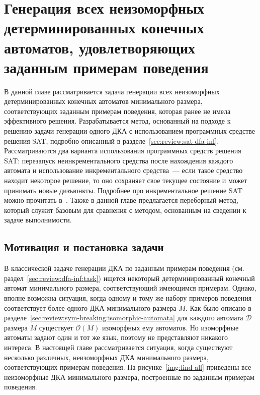 
\chapter{Генерация всех неизоморфных детерминированных конечных автоматов, удовлетворяющих заданным примерам поведения} 
\label{sec:findall}

В данной главе рассматривается задача генерации всех неизоморфных детерминированных конечных автоматов минимального размера, соответствующих заданным примерам поведения, которая ранее не имела эффективного решения.
Разрабатывается метод, основанный на подходе к решению задачи генерации одного ДКА с использованием программных средстве решения SAT, подробно описанный в разделе~\ref{sec:review:sat-dfa-inf}.
Рассматриваются два варианта использования программных средств решения SAT: перезапуск неинкрементального средства после нахождения каждого автомата и использование инкрементального средства~{---} если такое средство находит некоторое решение, то оно сохраняет свое текущее состояние и может принимать новые дизъюнкты.
Подробнее про инкрементальное решение SAT можно прочитать в~\cite{DBLP:conf/sat/EenS03}.
Также в данной главе предлагается переборный метод, который служит базовым для сравнения с методом, основанным на сведении к задаче выполнимости.


\section{Мотивация и постановка задачи}
\label{sec:findall:problem}

В классической задаче генерации ДКА по заданным примерам поведения (см. раздел~\ref{sec:review:dfa-inf:task}) ищется некоторый детерминированный конечный автомат минимального размера, соответствующий имеющимся примерам.
Однако, вполне возможна ситуация, когда одному и тому же набору примеров поведения соответствует более одного ДКА минимального размера $M$.
Как было описано в разделе~\ref{sec:review:sym-breaking:isomorphic-automata} для каждого автомата $\mathcal{D}$ размера $M$ существует $\mathcal{O}\left(M\right)$ изоморфных ему автоматов.
Но изоморфные автоматы задают один и тот же язык, поэтому не представляют никакого интереса.
В настоящей главе рассматривается ситуация, когда существуют несколько различных, неизоморфных ДКА минимального размера, соответствующих примерам поведения.
На рисунке~\ref{img:find-all} приведены все неизоморфные ДКА минимального размера, построенные по заданным примерам поведения.

